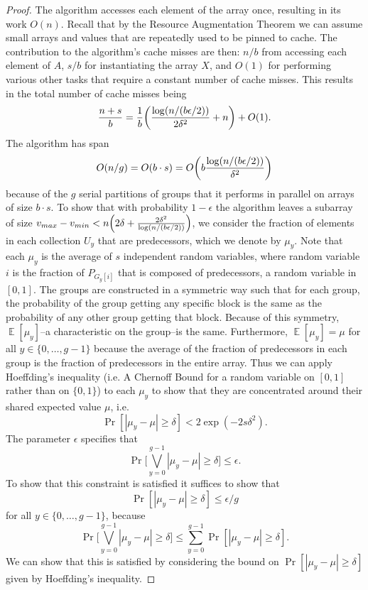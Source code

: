 \documentclass[sigconf]{acmart}
\DeclarePairedDelimiter{\paren}{(}{)}
\def\E{\operatorname{\mathbb{E}}}
\theoremstyle{remark}
\theoremstyle{remark}
\begin{document}
\begin{proof}
	The algorithm accesses each element of the array once, resulting in its work $O(n)$.
	Recall that by the Resource Augmentation Theorem we can assume small arrays and values that are repeatedly used to be pinned to cache.
	The contribution to the algorithm's cache misses are then:
	$n/b$ from accessing each element of $A$, $s/b$ for instantiating the array $X$, and $O(1)$ for performing various other tasks that require a constant number of cache misses. 
	This results in the total number of cache misses being $$\frac{n+s}{b} = \frac{1}{b}\paren*{\frac{\log (n/(b\epsilon/2))}{2\delta^2}+n} + O(1).$$
	The algorithm has span $$O(n/g) = O(b\cdot s) = O\paren*{b \frac{\log (n/(b\epsilon/2))}{\delta^2}}$$
	because of the $g$ serial partitions of groups that it performs in parallel on arrays of size $b\cdot s$.
	To show that with probability $1-\epsilon$ the algorithm leaves a subarray of size $v_{max}-v_{min} < n\paren*{2\delta + \frac{2\delta^2}{\log (n/(b\epsilon/2))}}$, we consider the fraction of elements in each collection $U_y$ that are predecessors, which we denote by $\mu_y$.
	Note that each $\mu_y$ is the average of $s$ independent random variables, where random variable $i$ is the fraction of $P_{G_y[i]}$ that is composed of predecessors, a random variable in $[0, 1]$.
	The groups are constructed in a symmetric way such that for each group, the probability of the group getting any specific block is the same as the probability of any other group getting that block. 
	Because of this symmetry, $\E[\mu_y]$--a characteristic on the group--is the same.
	Furthermore, $\E[\mu_y] = \mu$ for all $y \in \{0,\ldots,g-1\}$ because the average of the fraction of predecessors in each group is the fraction of predecessors in the entire array.	
	Thus we can apply Hoeffding's inequality (i.e. A Chernoff Bound for a random variable on $[0,1]$ rather than on $\{0,1\}$) to each $\mu_y$ to show that they are concentrated around their shared expected value $\mu$, i.e.
	$$\Pr[|\mu_y - \mu| \geq \delta] < 2\exp(-2s\delta^2). $$
	The parameter $\epsilon$ specifies that 
	$$\Pr\Big[\bigvee_{y=0}^{g-1} |\mu_y - \mu| \geq \delta\Big] \leq \epsilon.$$
	To show that this constraint is satisfied it suffices to show that 
	$$\Pr[|\mu_y - \mu| \geq \delta] \leq \epsilon/g $$ for all $y\in \{0,\ldots,g-1\}$, because
	$$\Pr\Big[\bigvee_{y=0}^{g-1} |\mu_y - \mu| \geq \delta\Big] \leq \sum_{y=0}^{g-1} \Pr[|\mu_y - \mu| \geq \delta].$$
	We can show that this is satisfied by considering the bound on $\Pr[|\mu_y - \mu| \geq \delta]$ given by Hoeffding's inequality. 

\end{proof}
\end{document}
